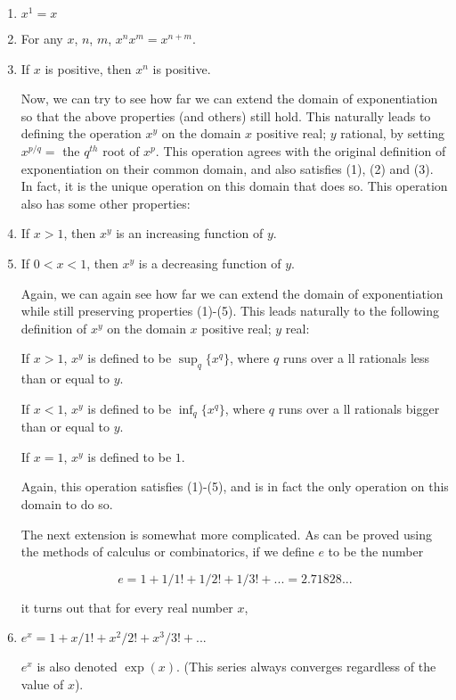 \begin{enumerate}
\item $x^1 = x$
\item For any $x$, $n$, $m$,  $x^n x^m = x^{n+m}$.
\item If $x$ is positive, then $x^n$ is positive.


Now, we can try to see how far we can extend the domain of
exponentiation so that the above properties (and others) still hold.  This
naturally leads to defining the operation $x^y$ on the domain {$x$ positive
real; $y$ rational}, by setting $x^{p/q} =$ the $q^{th}$ root of $x^p$.  This
operation agrees with the original definition of exponentiation on their
common domain, and also satisfies (1), (2) and (3).  In fact, it is the
unique operation on this domain that does so.  This operation also has
some other properties:

\item If $x>1$, then $x^y$ is an increasing function of $y$.
\item If $0<x<1$, then $x^y$ is a decreasing function of $y$.

Again, we can again see how far we can extend the domain of exponentiation
while still preserving properties (1)-(5).  This leads naturally to the
following definition of $x^y$ on the domain {$x$ positive real; $y$ real}:

        If $x>1$, $x^y$ is defined to be $\sup_q\{ x^q\}$, where $q$ runs over a
ll
rationals less than or equal to $y$.

        If $x<1$, $x^y$ is defined to be $\inf_q\{ x^q\}$, where $q$ runs over a
ll
rationals bigger than or equal to $y$.

        If $x=1$, $x^y$ is defined to be $1$.

Again, this operation satisfies (1)-(5), and is in fact the only operation
on this domain to do so.

The next extension is somewhat more complicated.  As can be proved using
the methods of calculus or combinatorics, if we define $e$ to be the number

\[e = 1 + 1/1! + 1/2! + 1/3! + ... = 2.71828...\]

it turns out that for every real number $x$,

\item $ e^x = 1 + x/1! + x^2/2! + x^3/3! + ...$

$e^x$ is also denoted $\exp(x)$.  (This series always converges regardless of
the value of $x$).


\end{enumerate}
